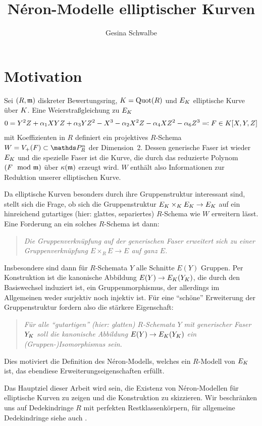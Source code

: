 \documentclass[german, bibliography=totoc]{scrreprt}
\title{
  Néron-Modelle elliptischer Kurven
}
\author{Gesina Schwalbe}
\begin{document}
\maketitle
\tableofcontents

\chapter{Motivation}

Sei $(R,\mathfrak{m})$ diskreter Bewertungsring, $K=\operatorname{Quot}(R)$ und $E_{K}$
elliptische Kurve über $K$. Eine Weierstraßgleichung zu $E_{K}$
\begin{gather*}
  0 = Y^2 Z + \alpha_1 XYZ + \alpha_3 YZ^2 - X^3 - \alpha_2X^2 Z - \alpha_4 XZ^2 - \alpha_6 Z^3
  \eqqcolon F\in K[X,Y,Z]  
\end{gather*}
mit Koeffizienten in $R$ definiert ein projektives $R$-Schema
$W=V_+(F)\subset\P_R^n$ der Dimension~2. Dessen generische Faser
ist wieder $E_{K}$ und die spezielle Faser ist die Kurve, die durch das
reduzierte Polynom $(F\mod{\mathfrak{m}})$ über $\kappa(\mathfrak{m})$ erzeugt wird.
$W$ enthält also Informationen zur Reduktion unserer elliptischen
Kurve.

Da elliptische Kurven besonders durch ihre Gruppenstruktur
interessant sind, stellt sich die Frage, ob sich die
Gruppenstruktur $E_{K}\times_{K} E_{K}\to E_{K}$ auf ein hinreichend
gutartiges (hier: glattes, separiertes) $R$-Schema wie $W$ erweitern
lässt.
Eine Forderung an ein solches $R$-Schema ist dann:
\begin{quote}
  \itshape
  Die Gruppenverknüpfung auf der generischen Faser erweitert sich zu
  einer Gruppenverknüpfung $E\times_R E\to E$ auf ganz $E$.
\end{quote}
Insbesondere sind dann für $R$-Schemata $Y$ alle Schnitte $E(Y)$
Gruppen. Per Konstruktion ist die kanonische Abbildung
$E(Y)\to E_{K}(Y_{K})$, die durch den Basiswechsel induziert ist, ein
Gruppenmorphismus, der allerdings im Allgemeinen weder surjektiv noch
injektiv ist. Für eine \enquote{schöne} Erweiterung der
Gruppenstruktur fordern also die stärkere Eigenschaft:
\begin{quote}
  \itshape
  Für alle \enquote{gutartigen} (hier: glatten) $R$-Schemata $Y$ mit
  generischer Faser $Y_{K}$ soll die kanonische Abbildung
  $E(Y)\to E_{K}(Y_{K})$ ein (Gruppen-)Isomorphismus sein.
\end{quote}
Dies motiviert die Definition des Néron-Modells, welches
ein $R$-Modell von $E_{K}$ ist, das ebendiese Erweiterungseigenschaften
erfüllt.

Das Hauptziel dieser Arbeit wird sein, die Existenz von Néron-Modellen
für elliptische Kurven zu zeigen und die Konstruktion zu skizzieren.
Wir beschränken uns auf Dedekindringe $R$ mit perfekten
Restklassenkörpern, für allgemeine Dedekindringe siehe auch
\cite{nonperfect}.
\end{document}

